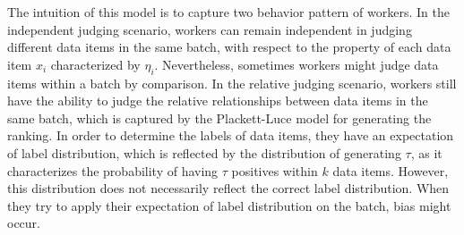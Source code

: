
The intuition of this model is to capture two behavior pattern of workers.
In the independent judging scenario, 
workers can remain independent in judging different data items in the same batch, 
with respect to the property of each data item $x_i$ characterized by $\eta_i$.  
Nevertheless, sometimes workers might judge data items within a batch by comparison. 
In the relative judging scenario, 
workers still have the ability to judge the relative relationships between data items in the same batch,
which is captured by the Plackett-Luce model for generating the ranking.  
In order to determine the labels of data items, 
they have an expectation of label distribution,
which is reflected by the distribution of generating $\tau$,
as it characterizes the probability of having $\tau$ positives within $k$ data items.
However, this distribution does not necessarily reflect the correct label distribution.  
When they try to apply their expectation of label distribution on the batch, bias might occur.

